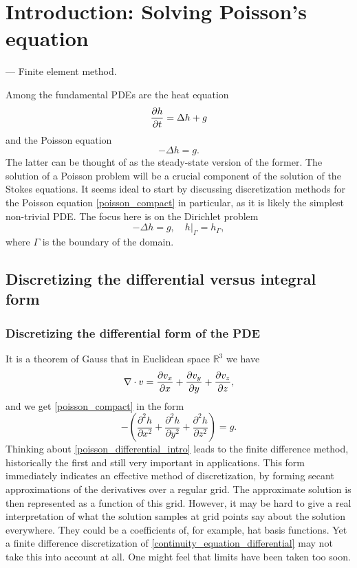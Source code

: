 
\section{Introduction: Solving Poisson's equation}

--- Finite element method.


Among the fundamental PDEs
are the heat equation
    $$\frac{\partial h}{\partial t} = \Delta h + g$$
and the Poisson equation
\begin{equation}\label{poisson_compact}
    -\Delta h = g.
\end{equation}
The latter can be thought of as the steady-state version of the former. The solution of a Poisson problem will be a crucial component
of the solution of the Stokes equations. It seems ideal to start by discussing
discretization methods for the Poisson equation \eqref{poisson_compact} in particular,
as it is likely the simplest non-trivial PDE.
The focus here is on the Dirichlet problem
\begin{equation}\label{poisson_dirichlet_problem}
    -\Delta h = g, \quad \left.h\right|_{\Gamma} = h_\Gamma,
\end{equation}
where $\Gamma$ is the boundary of the domain.

\subsection{Discretizing the differential versus integral form}
\subsubsection{Discretizing the differential form of the PDE}
It is a theorem of Gauss that in Euclidean space $\mathbb{R}^3$ we have
\begin{equation}\label{gauss_euclidean_divergence}
    \nabla \cdot v = \frac{\partial v_x}{\partial x} + \frac{\partial v_y}{\partial y} + \frac{\partial v_z}{\partial z},
\end{equation}
and we get \eqref{poisson_compact} in the form
\begin{equation}\label{poisson_differential_intro}
    -\left(\frac{\partial^2 h}{\partial x^2}
           +\frac{\partial^2 h}{\partial y^2}
           +\frac{\partial^2 h}{\partial z^2}\right) = g.
\end{equation}
Thinking about \eqref{poisson_differential_intro} leads to the finite difference method, historically the first and
still very important in applications.
This form immediately indicates an effective method
of discretization, by forming secant approximations of the derivatives over a regular grid. The approximate solution is then
represented as a function of this grid.
However, it may be hard to give a real interpretation of what the solution samples at grid points say about the solution everywhere.
They could be a coefficients of, for example, hat basis functions.
Yet a finite difference discretization of \eqref{continuity_equation_differential} may not take this into account at all. One might feel that
limits have been taken too soon.

